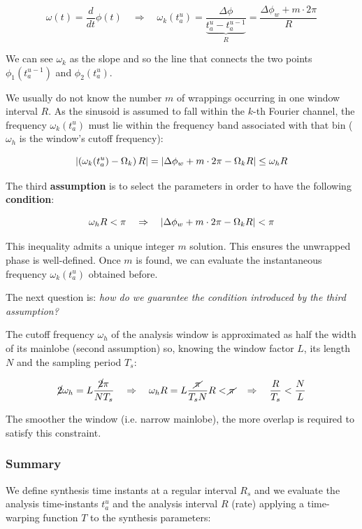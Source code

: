 \[
\omega(t) = \frac{d}{dt} \phi(t) \quad \Rightarrow \quad \omega_k (t_a^u) = \frac{\Delta \phi}{\underbrace{t_a^u - t_a^{u-1}}_R} = \frac{\Delta \phi_w + m \cdot 2\pi}{R}
\]

We can see $\omega_k$ as the slope and so the line that connects the two points $\phi_1(t_a^{u-1})$ and $\phi_2(t_a^{u})$.

We usually do not know the number $m$ of wrappings occurring in one window interval $R$.
As the sinusoid is assumed to fall within the $k$-th Fourier channel, the frequency $\omega_k(t_a^u)$ must lie within the frequency band associated with that bin ($\omega_h$ is the window's cutoff frequency):

\[
\abs{\left( \omega_k(t_a^u) - \Omega_k \right) R} = \abs{\Delta\phi_w + m \cdot 2\pi - \Omega_k R} \leq \omega_h R
\]

The third \textbf{assumption} is to select the parameters in order to have the following \textbf{condition}:

\[
\omega_h R < \pi \quad \Rightarrow \quad \abs{\Delta\phi_w + m \cdot 2\pi - \Omega_k R} < \pi
\]

This inequality admits a unique integer $m$ solution. This ensures the unwrapped phase is well-defined.
Once $m$ is found, we can evaluate the instantaneous frequency $\omega_k(t_a^u  )$ obtained before.

The next question is: \textit{how do we guarantee the condition introduced by the third assumption?}

The cutoff frequency $\omega_h$ of the analysis window is approximated as half the width of its mainlobe (second assumption) so, knowing the window factor $L$, its length $N$ and the sampling period $T_s$:

\[
\cancel{2} \omega_h = L \frac{\cancel{2} \pi}{N T_s} \quad \Rightarrow \quad
\omega_h R = L \frac{\cancel{\pi}}{T_s N} R < \cancel{\pi} \quad \Rightarrow \quad
\frac{R}{T_s} < \frac{N}{L}
\]

The smoother the window (i.e. narrow mainlobe), the more overlap is required to satisfy this constraint.

\subsubsection{Summary}

We define synthesis time instants at a regular interval $R_s$ and we evaluate the analysis time-instants $t_a^u$ and the analysis interval $R$ (rate) applying a time-warping function $T$ to the synthesis parameters:

